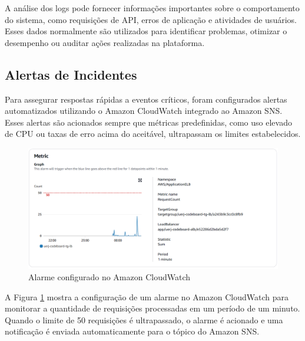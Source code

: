 A análise dos logs pode fornecer informações importantes sobre o comportamento do sistema, como requisições de API, erros de aplicação e atividades de usuários. Esses dados normalmente são utilizados para identificar problemas, otimizar o desempenho ou auditar ações realizadas na plataforma.

\subsection{Alertas de Incidentes}

Para assegurar respostas rápidas a eventos críticos, foram configurados alertas automatizados utilizando o Amazon CloudWatch integrado ao Amazon SNS. Esses alertas são acionados sempre que métricas predefinidas, como uso elevado de CPU ou taxas de erro acima do aceitável, ultrapassam os limites estabelecidos.

\begin{figure}[H]
    \centering
    \includegraphics[width=1\textwidth]{assets/monitoring-test/cloudwatch-alarm-config.png}
    \caption{Alarme configurado no Amazon CloudWatch}
    \label{fig:cloudwatch-alarm-config}
\end{figure}

A Figura \ref{fig:cloudwatch-alarm-config} mostra a configuração de um alarme no Amazon CloudWatch para monitorar a quantidade de requisições processadas em um período de um minuto. Quando o limite de 50 requisições é ultrapassado, o alarme é acionado e uma notificação é enviada automaticamente para o tópico do Amazon SNS.

